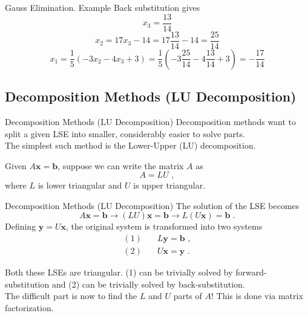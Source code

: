 \documentclass[11pt]{beamer}
\begin{document}
\begin{frame}[fragile]{Gauss Elimination. Example}
Back substitution gives
\begin{equation}
x_3 = \frac{13}{14} 
\end{equation}
\begin{equation}
x_2 = 17x_3 - 14 = 17\frac{13}{14} -14 = \frac{25}{14}
\end{equation}
\begin{equation}
x_1 = \frac{1}{5} \left( -3x_2 -4x_3 +3  \right) =  \frac{1}{5} \left( -3\frac{25}{14} -4\frac{13}{14} +3  \right) =-\frac{17}{14}
\end{equation}


\end{frame}

\subsection{Decomposition Methods (LU Decomposition)}

\begin{frame}[fragile]{Decomposition Methods (LU Decomposition)}
Decomposition methods want to split a given LSE into smaller,
considerably easier to solve parts. \\

The simplest such method is the
Lower-Upper (LU) decomposition.
\bigskip

Given $A\mathbf{x} = \mathbf{b}$, suppose we can write the matrix $A$
as 
\begin{equation}
A = L U\,\,,
\end{equation}
where $L$ is lower triangular and $U$ is upper triangular.
\end{frame}


\begin{frame}[fragile]{Decomposition Methods (LU Decomposition)}
The solution of the LSE becomes
\begin{equation}
A\mathbf{x} = \mathbf{b} \longrightarrow (LU)\mathbf{x}=\mathbf{b} \longrightarrow
L(U\mathbf{x})=\mathbf{b}\,\,.
\end{equation}
Defining $\mathbf{y} = U\mathbf{x}$, the
original system is transformed into two systems
\begin{equation}
\begin{aligned}
(1)\hspace{1em} & L\mathbf{y} = \mathbf{b}\,\,,\\
(2)\hspace{1em} & U\mathbf{x} = \mathbf{y}\,\,.
\end{aligned}
\end{equation}

Both these LSEs are triangular. (1) can be trivially solved by
forward-substitution and (2) can be trivially solved by
back-substitution.  \\

The difficult part is now to find the
$L$ and $U$ parts of $A$! This is done via matrix factorization.
\end{frame}
\end{document}
